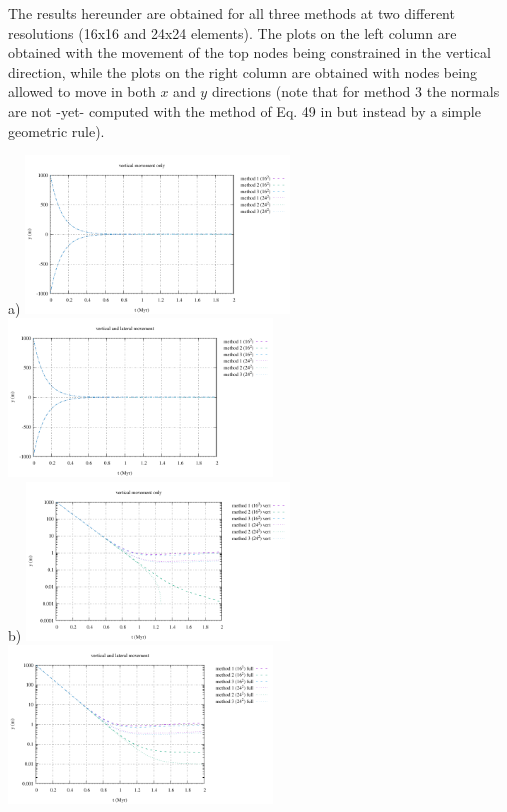 The results hereunder are obtained for all three methods at two different resolutions (16x16 
and 24x24 elements).
The plots on the left column are obtained with the movement of the top nodes being constrained in 
the vertical direction, while the plots on the right column are obtained with nodes being 
allowed to move in both $x$ and $y$ directions (note that for method 3 the normals are not -yet-
computed with the method of Eq. 49 in \cite{robh17} but instead by a simple geometric rule).

\begin{center}
a) \includegraphics[width=7cm]{python_codes/fieldstone_54/images/elevation_vert.pdf}
\includegraphics[width=7cm]{python_codes/fieldstone_54/images/elevation_full.pdf}\\
b) \includegraphics[width=7cm]{python_codes/fieldstone_54/images/elevation_log_vert.pdf}
\includegraphics[width=7cm]{python_codes/fieldstone_54/images/elevation_log_full.pdf}\\

\end{center}
